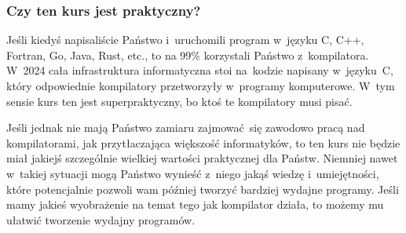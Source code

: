 \documentclass[10pt,t]{beamer}
\begin{document}
\begin{frame}
  \frametitle{Czy ten kurs jest praktyczny?}


  Jeśli kiedyś napisaliście Państwo i~uruchomili program w~języku C, C++,
  Fortran, Go, Java, Rust, etc., to na 99\% korzystali Państwo
  z~kompilatora. W~2024 cała infrastruktura informatyczna stoi
  na~kodzie napisany w~języku~C, który odpowiednie kompilatory przetworzyły
  w~programy komputerowe. W~tym sensie kurs ten jest superpraktyczny, bo
  ktoś te kompilatory musi pisać.

  Jeśli jednak nie mają Państwo zamiaru zajmować~się zawodowo pracą nad
  kompilatorami, jak przytłaczająca większość informatyków, to ten kurs nie
  będzie miał jakiejś szczególnie wielkiej wartości praktycznej dla Państw.
  Niemniej nawet w~takiej sytuacji mogą Państwo wynieść z~niego jakąś
  wiedzę i~umiejętności, które potencjalnie pozwoli wam później tworzyć
  bardziej wydajne programy. Jeśli mamy jakieś wyobrażenie na temat tego
  jak kompilator działa, to możemy mu ułatwić tworzenie wydajny programów.

\end{frame}
\end{document}

